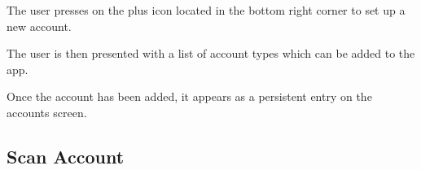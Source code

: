 \begin{minipage}{\textwidth}
  \centering
  \begin{minipage}[t]{4.6cm}
    \vspace{0pt}
    \centering
    \begin{minipage}{4.4cm}
      The user presses on the plus icon located in the bottom right corner to set up a new account.
    \end{minipage}
  \end{minipage}
  \begin{minipage}[t]{4.6cm}
    \vspace{0pt}
    \centering
    \begin{minipage}{4.4cm}
      The user is then presented with a list of account types which can be added to the app.
    \end{minipage}
  \end{minipage}
  \begin{minipage}[t]{4.6cm}
    \vspace{0pt}
    \centering
    \begin{minipage}{4.4cm}
      Once the account has been added, it appears as a persistent entry on the accounts screen.
    \end{minipage}
  \end{minipage}
\end{minipage}

\clearpage

\subsection{Scan Account}


